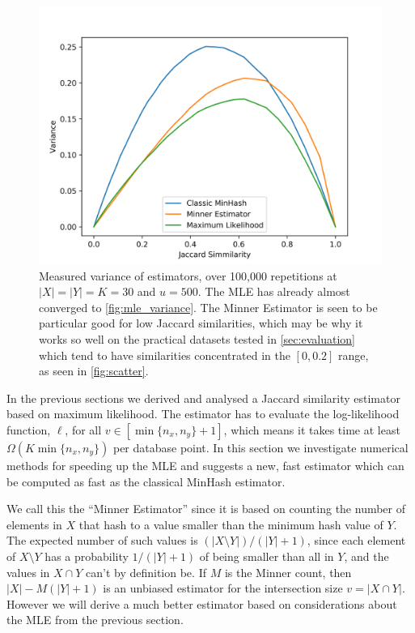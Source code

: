 \begin{figure}
   \includegraphics[trim=10 0 45 40,clip,width=\linewidth]{figures/synvar_100000.png}
   \caption{Measured variance of estimators, over 100,000 repetitions at $|X|=|Y|=K=30$ and $u=500$.
      The MLE has already almost converged to \cref{fig:mle_variance}.
      The Minner Estimator is seen to be particular good for low Jaccard similarities, which may be why it works so well on the practical datasets tested in \cref{sec:evaluation} which tend to have similarities concentrated in the $[0,0.2]$ range, as seen in \cref{fig:scatter}.}
   \label{fig:exp_variance}
\end{figure}

In the previous sections we derived and analysed a Jaccard similarity estimator based on maximum likelihood.
The estimator has to evaluate the log-likelihood function, $\ell$, for all $v\in[\min\{n_x,n_y\}+1]$, which means it takes time at least $\Omega(K\min\{n_x,n_y\})$ per database point.
In this section we investigate numerical methods for speeding up the MLE and suggests a new, fast estimator which can be computed as fast as the classical MinHash estimator.

We call this the ``Minner Estimator'' since it is based on counting the number of elements in $X$ that hash to a value smaller than the minimum hash value of $Y$.
The expected number of such values is $(|X\setminus Y|)/(|Y|+1)$, since each element of $X\setminus Y$ has a probability $1/(|Y|+1)$ of being smaller than all in $Y$, and the values in $X\cap Y$ can't by definition be.
If $M$ is the Minner count, then $|X| - M(|Y|+1)$ is an unbiased estimator for the intersection size $v=|X\cap Y|$.
However we will derive a much better estimator based on considerations about the MLE from the previous section.

